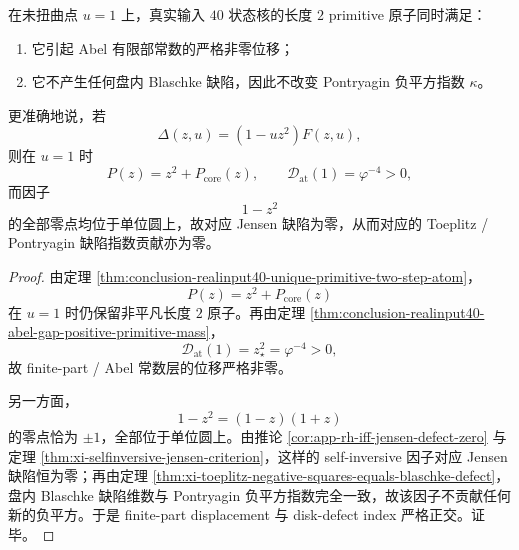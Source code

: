 \begin{theorem}\label{thm:conclusion-realinput40-finitepart-diskdefect-orthogonality}
在未扭曲点 \(u=1\) 上，真实输入 \(40\) 状态核的长度 \(2\) primitive 原子同时满足：
\begin{enumerate}
  \item 它引起 Abel 有限部常数的严格非零位移；
  \item 它不产生任何盘内 Blaschke 缺陷，因此不改变 Pontryagin 负平方指数 \(\kappa\)。
\end{enumerate}
更准确地说，若
\[
\Delta(z,u)=(1-uz^2)F(z,u),
\]
则在 \(u=1\) 时
\[
P(z)=z^2+P_{\mathrm{core}}(z),
\qquad
\mathcal D_{\mathrm{at}}(1)=\varphi^{-4}>0,
\]
而因子
\[
1-z^2
\]
的全部零点均位于单位圆上，故对应 Jensen 缺陷为零，从而对应的 Toeplitz / Pontryagin 缺陷指数贡献亦为零。
\end{theorem}
\begin{proof}
由定理 \ref{thm:conclusion-realinput40-unique-primitive-two-step-atom}，
\[
P(z)=z^2+P_{\mathrm{core}}(z)
\]
在 \(u=1\) 时仍保留非平凡长度 \(2\) 原子。再由定理 \ref{thm:conclusion-realinput40-abel-gap-positive-primitive-mass}，
\[
\mathcal D_{\mathrm{at}}(1)=z_\star^2=\varphi^{-4}>0,
\]
故 finite-part / Abel 常数层的位移严格非零。

另一方面，
\[
1-z^2=(1-z)(1+z)
\]
的零点恰为 \(\pm 1\)，全部位于单位圆上。由推论 \ref{cor:app-rh-iff-jensen-defect-zero} 与定理 \ref{thm:xi-selfinversive-jensen-criterion}，这样的 self-inversive 因子对应 Jensen 缺陷恒为零；再由定理 \ref{thm:xi-toeplitz-negative-squares-equals-blaschke-defect}，盘内 Blaschke 缺陷维数与 Pontryagin 负平方指数完全一致，故该因子不贡献任何新的负平方。于是 finite-part displacement 与 disk-defect index 严格正交。证毕。
\end{proof}


